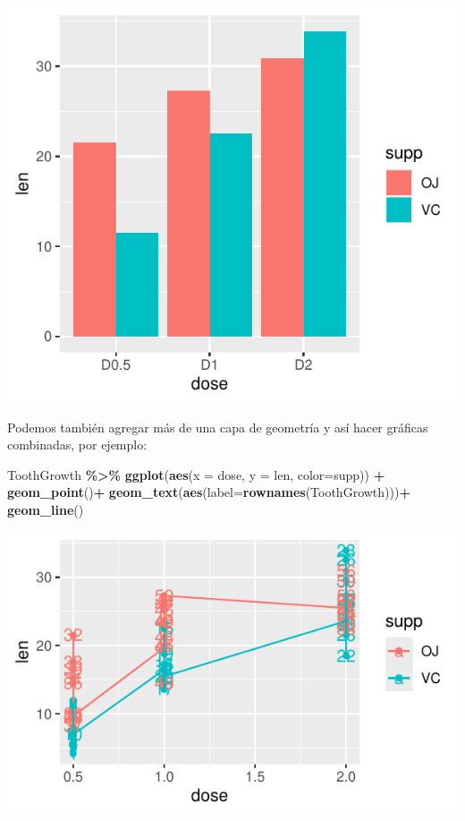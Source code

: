 \documentclass[
]{book}
\newenvironment{Shaded}{\begin{snugshade}}{\end{snugshade}}
\newcommand{\AttributeTok}[1]{\textcolor[rgb]{0.13,0.29,0.53}{#1}}
\newcommand{\FunctionTok}[1]{\textcolor[rgb]{0.13,0.29,0.53}{\textbf{#1}}}
\newcommand{\NormalTok}[1]{#1}
\newcommand{\SpecialCharTok}[1]{\textcolor[rgb]{0.81,0.36,0.00}{\textbf{#1}}}
\begin{document}
\begin{center}\includegraphics{_main_files/figure-latex/unnamed-chunk-209-1} \end{center}

Podemos también agregar más de una capa de geometría y así hacer gráficas combinadas, por ejemplo:\\

\begin{Shaded}
\begin{Highlighting}[]
\NormalTok{ToothGrowth }\SpecialCharTok{\%\textgreater{}\%} \FunctionTok{ggplot}\NormalTok{(}\FunctionTok{aes}\NormalTok{(}\AttributeTok{x =}\NormalTok{ dose, }\AttributeTok{y =}\NormalTok{ len, }\AttributeTok{color=}\NormalTok{supp)) }\SpecialCharTok{+}
  \FunctionTok{geom\_point}\NormalTok{()}\SpecialCharTok{+}
  \FunctionTok{geom\_text}\NormalTok{(}\FunctionTok{aes}\NormalTok{(}\AttributeTok{label=}\FunctionTok{rownames}\NormalTok{(ToothGrowth)))}\SpecialCharTok{+}
  \FunctionTok{geom\_line}\NormalTok{()}
\end{Highlighting}
\end{Shaded}

\begin{center}\includegraphics{_main_files/figure-latex/unnamed-chunk-210-1} \end{center}
\end{document}

